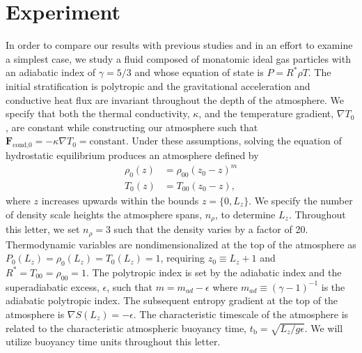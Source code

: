 \documentclass[aps, prl, twocolumn, groupedaddress, amsfonts, amssymb, amsmath]{revtex4-1}
\newcommand{\grad}{\ensuremath{\nabla}}
\begin{document}
\section{Experiment} 
\label{sec:experiment}
In order to compare our results with previous studies and in an effort to examine a simplest case,
we study a fluid composed of monatomic ideal gas particles with an adiabatic index of $\gamma = 5/3$ and
whose equation of state is $P = R^*\rho T$. 
The initial stratification is polytropic and the gravitational
acceleration and conductive heat flux are invariant throughout the depth of the atmosphere. We specify that both 
the thermal conductivity, $\kappa$, and the temperature gradient, $\grad T_0$, are constant while constructing
our atmosphere such that $\bm{F}_{\text{cond,0}} = -\kappa \grad T_0 = \text{constant}$.
Under these assumptions, solving the equation of hydrostatic equilibrium produces an atmosphere defined by
\begin{equation}
\begin{split}
\rho_0(z) &= \rho_{00}(z_0 - z)^m \\
T_0(z)    &= T_{00}(z_0 - z),
\label{eqn:polytrope}
\end{split}
\end{equation}
where $z$ increases upwards within the bounds $z =\{0, L_{z}\}$.
We specify the number of density scale heights the atmosphere spans, $n_\rho$, to determine $L_{z}$. Throughout
this letter, we set $n_{\rho} = 3$ such that the density varies by a factor of 20.
Thermodynamic variables are nondimensionalized at the top of the atmosphere as 
$P_0(L_z) = \rho_0(L_z) = T_0(L_z) = 1$, requiring $z_0 \equiv L_z + 1$ and $R^* = T_{00} = \rho_{00} = 1$.  
The polytropic index is set by the adiabatic index and the
superadiabatic excess, $\epsilon$, such that $m = m_{ad} - \epsilon$
where $m_{ad} \equiv (\gamma-1)^{-1}$ is the adiabatic polytropic index.
The subsequent entropy gradient at the top of the atmosphere is $\grad S(L_z) = -\epsilon$.  
The characteristic timescale of the
atmosphere is related to the characteristic atmospheric buoyancy time, $t_{\text{b}} = \sqrt{L_z/g\epsilon}$.
We will utilize buoyancy time units throughout this letter.
\end{document}
